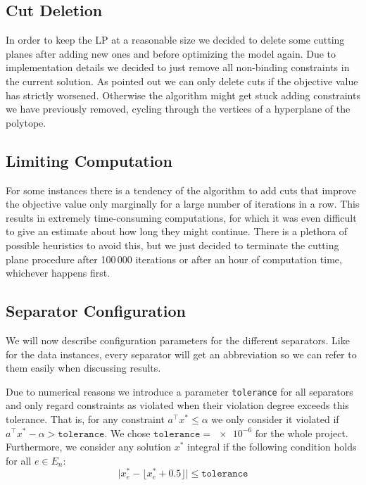 \subsection{Cut Deletion}\label{subsec:cut_deletion}
In order to keep the LP at a reasonable size we decided to delete some cutting planes after adding new ones and before optimizing the model again.
Due to implementation details we decided to just remove all non-binding constraints in the current solution.
As \cite{sorensenSeparationHeuristic2Partition2020} pointed out we can only delete cuts if the objective value has strictly worsened.
Otherwise the algorithm might get stuck adding constraints we have previously removed, cycling through the vertices of a hyperplane of the polytope.

\subsection{Limiting Computation}\label{subsec:limiting_computation}
For some instances there is a tendency of the algorithm to add cuts that improve the objective value only marginally for a large number of iterations in a row.
This results in extremely time-consuming computations, for which it was even difficult to give an estimate about how long they might continue.
There is a plethora of possible heuristics to avoid this, but we just decided to terminate the cutting plane procedure after 100\,000 iterations or after an hour of computation time, whichever happens first.

\subsection{Separator Configuration}\label{subsec:run_configs}
We will now describe configuration parameters for the different separators.
Like for the data instances, every separator will get an abbreviation so we can refer to them easily when discussing results.

Due to numerical reasons we introduce a parameter \texttt{tolerance} for all separators and only regard constraints as violated when their violation degree exceeds this tolerance.
That is, for any constraint $a^{\top} x^{*} \leq \alpha$ we only consider it violated if $a^{\top} x^{*} - \alpha > \texttt{tolerance}$.
We chose $\texttt{tolerance} = \num{e-6}$ for the whole project.
Furthermore, we consider any solution $x^{*}$ integral if the following condition holds for all $e \in E_{n}$:
\[
 \big\lvert x_{e}^{*} - \lfloor x_{e}^{*} + 0.5 \rfloor \big\rvert \leq \texttt{tolerance}
\]


